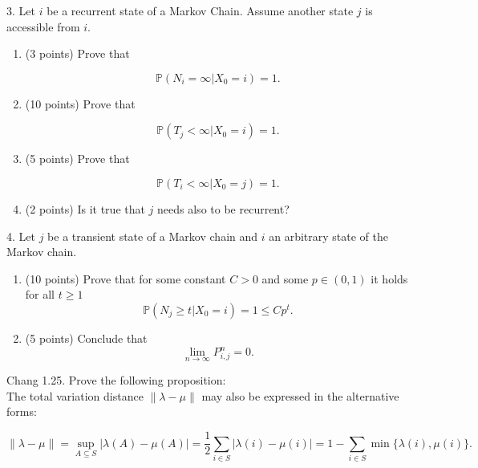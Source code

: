 \documentclass{article}
\begin{document}
3. Let $i$ be a recurrent state of a Markov Chain. Assume another state $j$ is accessible from $i$.

\begin{enumerate}[label=(\alph*)]
    \item (3 points) Prove that 

\[
\mathbb{P}(N_i = \infty | X_0 = i) = 1.
\]

\item (10 points) Prove that 

\[
\mathbb{P}(T_j < \infty | X_0 = i) = 1.
\]

\item (5 points) Prove that 

\[
\mathbb{P}(T_i < \infty | X_0 = j) = 1.
\]

\item (2 points) Is it true that $j$ needs also to be recurrent?
\end{enumerate}

4. Let $j$ be a transient state of a Markov chain and $i$ an arbitrary state of the Markov chain.
 
\begin{enumerate}[label=(\alph*)]
    \item (10 points) Prove that for some constant $C > 0$ and some $p \in (0,1)$ it holds for all $t \geq 1$
\[
\mathbb{P}(N_j \geq t | X_0 = i) = 1 \leq C p^t.
\]

\item (5 points) Conclude that 
\[
\lim_{n \to \infty} P^n_{i,j} = 0.
\]
\end{enumerate}

Chang 1.25. Prove the following proposition:  \\
The total variation distance $\|\lambda - \mu\|$ may also be expressed in the alternative forms:

\[
\|\lambda - \mu\| = \sup_{A \subseteq S} |\lambda(A) - \mu(A)| = \frac{1}{2} \sum_{i \in S} |\lambda(i) - \mu(i)| = 1 - \sum_{i \in S} \min\{\lambda(i), \mu(i)\}.
\]
\end{document}
